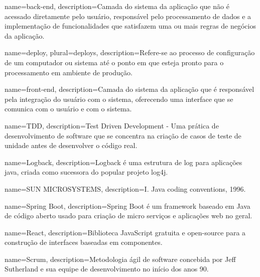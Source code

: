 



 {
	name=back-end,
	description={Camada do sistema da aplicação que não é acessado diretamente pelo usuário, responsável pelo processamento de dados e a implementação de funcionalidades que satisfazem uma ou mais regras de negócios da aplicação.}
}

 {
	name=deploy,
	plural=deploys,
	description={Refere-se ao processo de configuração de um computador ou sistema até o ponto em que esteja pronto para o processamento em ambiente de produção.}
}

 {
	name=front-end,
	description={Camada do sistema da aplicação que é responsável pela integração do usuário com o sistema, oferecendo uma interface que se comunica com o usuário e com o sistema.}
}

 {
	name=TDD,
	description={Test Driven Development - Uma prática de desenvolvimento de software que se concentra na criação de casos de teste de unidade antes de desenvolver o código real.}
}

 {
	name=Logback,
	description={Logback é uma estrutura de log para aplicações java, criada como sucessora do popular projeto log4j.}
}

 {
	name=SUN MICROSYSTEMS,
	description={I. Java coding conventions, 1996.}
}

 {
	name=Spring Boot,
	description={Spring Boot é um \gls{framework} baseado em Java de código aberto usado para criação de micro serviços e aplicações web no geral.}
}

 {
	name=React,
	description={Biblioteca JavaScript gratuita e open-source para a construção de interfaces baseadas em componentes.}
}

 {
	name=Scrum,
	description={Metodologia ágil de software concebida por Jeff Sutherland e sua equipe de desenvolvimento no início dos anos 90.}
}

